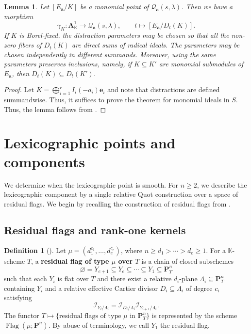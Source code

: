 \documentclass[leqno,11pt,a4paper]{amsart}
\newtheorem{lemma}[lemma]{Lemma}
\theoremstyle{definition}
\newtheorem{definition}[definition]{Definition}
\numberwithin{equation}{section}
\newcommand{\kk}{\mathbb{K}}
\newcommand{\bfa}{\mathbf{a}}
\newcommand{\PP}{\mathbf{P}}
\newcommand{\bfe}{\mathbf{e}}
\newcommand{\II}{\mathscr{I}}
\newcommand{\QQ}{\mathcal{Q}}
\DeclareMathOperator{\Flag}{Flag}
\begin{document}
\begin{lemma}\label{lemma_distraction}
Let $[E_{\bfa}/K]$ be a monomial point of $\QQ_{\bfa}(s,\lambda)$. Then we have a morphism
$$
\gamma_K:\mathbf{A}^1_\kk\longrightarrow\QQ_{\bfa}(s,\lambda),
\qquad t \mapsto [E_{\bfa}/D_t(K)].
$$
If $K$ is Borel-fixed, the distraction parameters may be chosen so that all the non-zero fibers of $D_t(K)$ are direct sums of radical ideals. The parameters may be chosen independently in different summands.
Moreover, using the same parameters preserves inclusions, namely,  if $K\subseteq K'$ are monomial submodules of $E_{\bfa}$, then $D_t(K)\subseteq D_t(K')$.
\end{lemma}

\begin{proof} Let $K=\bigoplus_{i=1}^r I_i(-a_i)\bfe_i$ and note that  distractions are defined summandwise. Thus, it suffices to prove the theorem for monomial ideals in $S$. 
Thus, the lemma follows from  \cite[Proposition~2.9, Corollary~2.10, Proposition~2.26]{BCR05}.
\end{proof}

\section{Lexicographic points and components}\label{sec:lex}
We determine when the lexicographic point is smooth. 
For $n\geq2$, we describe the lexicographic component by a single relative Quot construction over a space of residual flags. We begin by recalling the construction of residual flags from \cite{SS23}.

\subsection{Residual flags and rank-one kernels}

\begin{definition}[{\cite[Definition~1.4]{SS23}}] \label{residual_flag}
Let $\mu=(d_1^{c_1},\ldots,d_e^{c_e})$, where $n\geq d_1>\cdots>d_e\geq1$.
For a $\kk$-scheme $T$, a \textbf{residual flag of type $\mu$ over $T$} is a chain of closed subschemes
$$
\varnothing = Y_{e+1}\subseteq Y_e\subseteq\cdots\subseteq Y_1
\subseteq\PP^n_T
$$
such that each $Y_i$ is flat over $T$ and there exist a relative $d_i$-plane $\Lambda_i\subseteq\PP^n_T$ containing $Y_i$ and a relative effective Cartier divisor $D_i\subseteq\Lambda_i$ of degree $c_i$ satisfying
$$
\II_{Y_i/\Lambda_i}
=\II_{D_i/\Lambda_i}\II_{Y_{i+1}/\Lambda_i}.
$$
The functor $T \mapsto \{\text{residual flags of type $\mu$ in $\PP^n_T$}\}$ is represented by the scheme $\Flag(\mu;\PP^n)$. By abuse of terminology, we call $Y_1$ the residual flag.
\end{definition}
\end{document}
